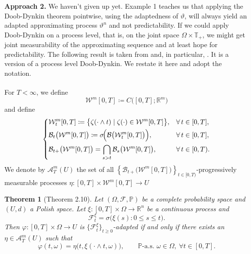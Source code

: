 \documentclass[11pt]{report}
\theoremstyle{plain} %
\newtheorem{theorem}{Theorem}[chapter]
\theoremstyle{definition} %
\theoremstyle{remark} %
\begin{document}
\textbf{Approach 2.}
We haven't given up yet. Example 1 teaches us that applying the Doob-Dynkin theorem pointwise, using the adaptedness of \(\vartheta\), will always yield an adapted approximating process \(\vartheta^n\) and not predictability. If we could apply Doob-Dynkin on a process level, that is, on the joint space \(\Omega\times\mathbb{T}_+\), we might get joint measurability of the approximating sequence and at least hope for predictability.  The following result is taken from \parencite{YongZhou1999StochasticControls} and, in particular, \parencite[Thm.~2.10.]{YongZhou1999StochasticControls}. It is a version of a process level Doob-Dynkin. We restate it here and adopt the notation.\\\\
For $T<\infty$, we define
\[
\mathcal{W}^m[0,T] \coloneqq C\bigl([0,T];\mathbb{R}^m\bigr)
\]
and define
\begin{equation}\label{eq:2.10}
\left\{
\begin{aligned}
&\mathcal{W}^m_t[0,T]
\coloneqq \bigl\{\zeta(\cdot\wedge t)\mid \zeta(\cdot)\in \mathcal{W}^m[0,T]\bigr\},
&& \forall\, t\in[0,T],\\
&\mathcal{B}_t\bigl(\mathcal{W}^m[0,T]\bigr)
\coloneqq \sigma\!\Bigl(\mathcal{B}\bigl(\mathcal{W}^m_t[0,T]\bigr)\Bigr),
&& \forall\, t\in[0,T],\\
&\mathcal{B}_{t+}\bigl(\mathcal{W}^m[0,T]\bigr)
= \bigcap_{s>t}\mathcal{B}_s\bigl(\mathcal{W}^m[0,T]\bigr),
&& \forall\, t\in[0,T).
\end{aligned}
\right.
\end{equation}
We denote by \(\mathcal{A}_T^m(U)\) the set of all \(\left\{\mathcal{B}_{t+}\bigl(\mathcal{W}^m[0,T]\bigr)\right\}_{t\in[0,T)}\)-progressively measurable processes \(\eta:[0,T]\times\mathcal{W}^m[0,T]\to U\)
\begin{theorem}[Theorem 2.10]\label{thm:process level doob dynkin}
Let $(\Omega,\mathcal{F},\mathbb{P})$ be a complete probability space and $(U,d)$ a Polish space.
Let $\xi:[0,T]\times\Omega\to\mathbb{R}^n$ be a continuous process and
\[
\mathcal{F}_t^\xi=\sigma\bigl(\xi(s):0\le s\le t\bigr).
\]
Then $\varphi:[0,T]\times\Omega\to U$ is $\{\mathcal{F}_t^\xi\}_{t\ge 0}$-adapted if and only if there exists
an $\eta\in\mathcal{A}_T^m(U)$ such that
\begin{equation}\label{eq:2.12}
\varphi(t,\omega)=\eta\bigl(t,\xi(\cdot\wedge t,\omega)\bigr),
\qquad \mathbb{P}\text{-a.s. }\omega\in\Omega,\ \forall t\in[0,T].
\end{equation}
\end{theorem}
\end{document}
